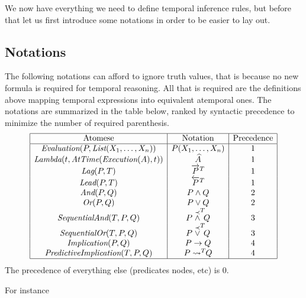 \documentclass[runningheads]{llncs}
\newcommand{\SP}{\;\;\;}
\newcommand{\TEval}{\textit{Evaluation}}
\newcommand{\TList}{\textit{List}}
\newcommand{\TLamb}{\textit{Lambda}}
\newcommand{\TExec}{\textit{Execution}}
\newcommand{\TAtTime}{\textit{AtTime}}
\newcommand{\TAnd}{\textit{And}}
\newcommand{\TOr}{\textit{Or}}
\newcommand{\TImpl}{\textit{Implication}}
\newcommand{\TPredImpl}{\textit{PredictiveImplication}}
\newcommand{\TSeqAnd}{\textit{SequentialAnd}}
\newcommand{\TSeqOr}{\textit{SequentialOr}}
\newcommand{\TLag}{\textit{Lag}}
\newcommand{\TLead}{\textit{Lead}}
\newcommand{\TTV}{\textit{TV}}
\newcommand{\TBTV}{\langle \TTV \rangle}
\newcommand{\MAnd}{\wedge}
\newcommand{\MOr}{\vee}
\newcommand{\MImpl}{\rightarrow}
\newcommand{\MPredImpl}[1]{\leadsto^{#1}}
\newcommand{\MSeqAnd}[1]{\stackrel{\prec}{\wedge}^{#1}\!\!\!}
\newcommand{\MSeqOr}[1]{\stackrel{\prec}{\vee}^{#1}\!\!\!}
\newcommand{\MDo}[1]{\widehat{#1}}
\newcommand{\MLag}[2]{\overrightarrow{#1}^{#2}}
\newcommand{\MLead}[2]{\overleftarrow{#1}^{#2}}
\begin{document}
We now have everything we need to define temporal inference rules, but
before that let us first introduce some notations in order to be
easier to lay out.

\subsection{Notations}

The following notations can afford to ignore truth values, that is
because no new formula is required for temporal reasoning.  All that
is required are the definitions above mapping temporal expressions
into equivalent atemporal ones.  The notations are summarized in the
table below, ranked by syntactic precedence to minimize the number of
required parenthesis.
$$
\begin{array}{|c|c|c|}
  \hline
  \text{Atomese} & \text{Notation} & \text{Precedence} \\
  \hline
  \TEval(P, \TList(X_1, \dots, X_n)) & P(X_1, \dots, X_n) & 1 \\
  \TLamb(t, \TAtTime(\TExec(A), t)) & \MDo{A} & 1 \\
  \TLag(P, T) & \MLag{P}{T} & 1 \\
  \TLead(P, T) & \MLead{P}{T} & 1 \\
  \TAnd(P, Q) & P \MAnd Q & 2 \\
  \TOr(P, Q) & P \MOr Q & 2 \\
  \TSeqAnd(T, P, Q) & P \MSeqAnd{T} Q & 3 \\
  \TSeqOr(T, P, Q) & P \MSeqOr{T} Q & 3 \\
  \TImpl(P, Q) & P \MImpl Q & 4 \\
  \TPredImpl(T, P, Q) & P \MPredImpl{T} \! \! Q & 4 \\
  \hline
\end{array}
$$
The precedence of everything else (predicates nodes, etc) is 0.


For instance

\end{document}
